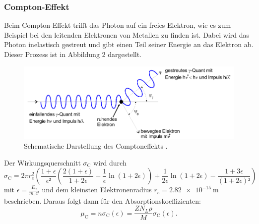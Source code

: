 \subsubsection{Compton-Effekt}
\label{sec:Compton-Effekt}
Beim Compton-Effekt trifft das Photon auf ein freies Elektron, wie es zum Beispiel bei den leitenden Elektronen
von Metallen zu finden ist. Dabei wird das Photon inelastisch gestreut und gibt einen Teil seiner Energie an das
Elektron ab. Dieser Prozess ist in Abbildung 2 dargestellt.
\begin{figure}
    \centering
    \label{fig:compton}
    \includegraphics[width=\textwidth]{Bilder/Compton.png}
    \caption{Schematische Darstellung des Comptoneffekts \cite{sample}.}
\end{figure}
Der Wirkungsquerschnitt $\sigma_\text{C}$ wird durch
\begin{equation}
	\sigma_\text{C}=2\pi  r_e^2\left(\frac{1+\epsilon}{\epsilon²}\left(\frac{2(1+\epsilon)}{1+2\epsilon}-\frac{1}{\epsilon}\ln(1+2\epsilon)\right)+\frac{1}{2\epsilon}\ln(1+2\epsilon)-\frac{1+3\epsilon}{(1+2\epsilon)²}\right)
\label{eq:sigma_c}
\end{equation}
mit $\epsilon=\frac{E_{\gamma}}{m_0c²}$ und dem kleinsten Elektronenradius $r_e=\SI{2.82e-15}{\meter}$ beschrieben. 
Daraus folgt dann für den Absorptionskoeffizienten:
\begin{equation}
	\mu_\text{C}=n\sigma_\text{C}(\epsilon)=\frac{Z N_L \rho}{M}\sigma_\text{C}(\epsilon).
\label{eq:mu_c}
\end{equation}

